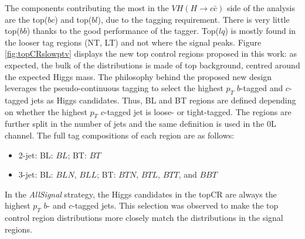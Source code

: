 The components contributing the most in the $VH(H\rightarrow c\bar{c})$ side of the analysis are the top($bc$) and top($bl$), due to the tagging requirement. There is very little top($bb$) thanks to the good performance of the tagger. Top($lq$) is mostly found in the looser tag regions (NT, LT) and not where the signal peaks. Figure \ref{fig:topCRslowptv} displays the new top control regions proposed in this work: as expected, the bulk of the distributions is made of top background, centred around the expected Higgs mass. The philosophy behind the proposed new design leverages the pseudo-continuous tagging to select the highest $p_T$ $b$-tagged and $c$-tagged jets as Higgs candidates. Thus, BL and BT regions are defined depending on whether the highest $p_T$ $c$-tagged jet is loose- or tight-tagged. The regions are further split in the number of jets and the same definition is used in the 0L channel. The full tag compositions of each region are as follows:

\begin{itemize}
\item 2-jet: \quad BL: $BL$;  \quad BT: $BT$
\item 3-jet:  \quad BL: $BLN$, $BLL$;  \quad BT: $BTN$, $BTL$, $BTT$, and $BBT$
\end{itemize}
In the \textit{AllSignal} strategy, the Higgs candidates in the topCR are always the highest $p_T$ $b$- and $c$-tagged jets. This selection was observed to make the top control region distributions more closely match the distributions in the signal regions. \\

